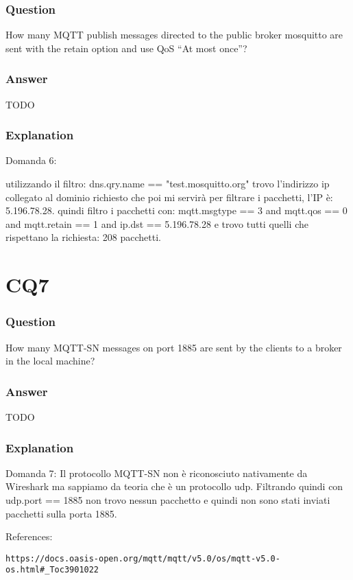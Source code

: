 \subsubsection{Question}
How many MQTT publish messages directed to the public broker mosquitto are sent with the retain option and use QoS “At most once”?

\subsubsection{Answer}
TODO 

\subsubsection{Explanation}

Domanda 6:

utilizzando il filtro: dns.qry.name == "test.mosquitto.org" trovo l'indirizzo ip collegato al dominio richiesto che poi mi servirà per filtrare i pacchetti, l'IP è:  5.196.78.28.
quindi filtro i pacchetti con: mqtt.msgtype == 3 and mqtt.qos == 0 and mqtt.retain == 1 and ip.dst == 5.196.78.28 e trovo tutti quelli che rispettano la richiesta: 208 pacchetti.

\section{CQ7}
\subsubsection{Question}
How many MQTT-SN messages on port 1885 are sent by the clients to a broker in the local machine?

\subsubsection{Answer}
TODO 

\subsubsection{Explanation}

Domanda 7: 
Il protocollo MQTT-SN non è riconosciuto nativamente da Wireshark ma sappiamo da teoria che è un protocollo udp. Filtrando quindi con udp.port == 1885 non trovo nessun pacchetto e quindi non sono stati inviati pacchetti sulla porta 1885.


References:
\begin{verbatim}
https://docs.oasis-open.org/mqtt/mqtt/v5.0/os/mqtt-v5.0-os.html#_Toc3901022
\end{verbatim}






















